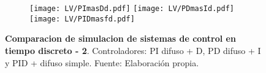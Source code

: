     \begin{figure}[htb]
        \centering
        \begin{subfigure}[t]{0.99\textwidth}
            \centering
            \texttt{[image: LV/PImasDd.pdf]}
            \texttt{[image: LV/PDmasId.pdf]}
            \texttt{[image: LV/PIDmasfd.pdf]}
            \label{fig:simD2}
        \end{subfigure}
        \caption[Comparacion de simulacion de sistemas de control discretos - 2]{\textbf{Comparacion de simulacion de sistemas de control en tiempo discreto - 2}. Controladores: PI difuso + D, PD difuso + I y PID + difuso simple. Fuente: Elaboración propia. \label{fig:simC2f}}
    \end{figure}